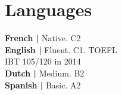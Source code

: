 \documentclass[a4paper]{deedy-resume} %
\begin{document}
\begin{minipage}[b]{0.25\linewidth}
	
	\section{Languages}
	\textbf{French  \hspace{2pt} | \hspace{2pt}} Native. C2\\
	 \textbf{English   \hspace{2pt}| \hspace{2pt}}  Fluent. C1. TOEFL \\ IBT 105/120 in 2014\\
	  \textbf{Dutch  \hspace{2pt} | \hspace{2pt}}  Medium. B2\\
	  \textbf{Spanish  \hspace{2pt} | \hspace{2pt}}  Basic. A2
	\vspace{79pt}
	
\end{minipage}

\vspace{10pt}
\end{document}
